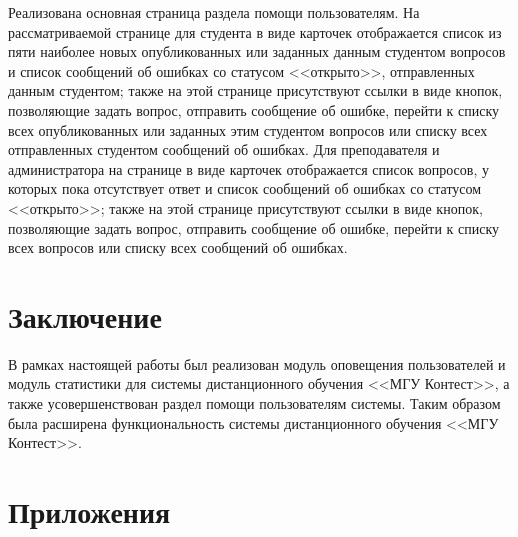 \documentclass[12pt, a4paper, oneside]{article}
\begin{document}
Реализована основная страница раздела помощи пользователям. На рассматриваемой странице для студента в виде карточек отображается список из пяти наиболее новых опубликованных или заданных данным студентом вопросов и список сообщений об ошибках со статусом <<открыто>>, отправленных данным студентом; также на этой странице присутствуют ссылки в виде кнопок, позволяющие задать вопрос, отправить сообщение об ошибке, перейти к списку всех опубликованных или заданных этим студентом вопросов или списку всех отправленных студентом сообщений об ошибках. Для преподавателя и администратора на странице в виде карточек отображается список вопросов, у которых пока отсутствует ответ и список сообщений об ошибках со статусом <<открыто>>; также на этой странице присутствуют ссылки в виде кнопок, позволяющие задать вопрос, отправить сообщение об ошибке, перейти к списку всех вопросов или списку всех сообщений об ошибках.
\newpage

\section{Заключение}
В рамках настоящей работы был реализован модуль оповещения пользователей и модуль статистики для системы дистанционного обучения <<МГУ Контест>>, а также усовершенствован раздел помощи пользователям системы. Таким образом была расширена функциональность системы дистанционного обучения <<МГУ Контест>>.
\newpage

\section{Приложения}
\end{document}
